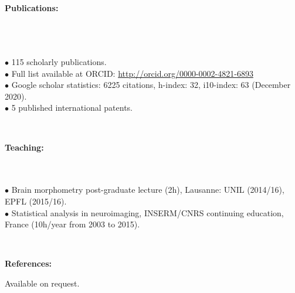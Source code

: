 \documentclass[english,10pt,a4paper]{scrartcl}
\begin{document}
\ \\
\noindent 
\begin{minipage}{.15\textwidth}
\textbf{Publications:}
\ \\ 
\ \\
\ \\
\ \\
\end{minipage}
\begin{minipage}{.85\textwidth}
{\tiny$\bullet$} 115 scholarly publications.\\
{\tiny$\bullet$} Full list available at ORCID: \url{http://orcid.org/0000-0002-4821-6893} \\
{\tiny$\bullet$} Google scholar statistics: 6225 citations, h-index: 32, i10-index: 63 (December 2020).\\
{\tiny$\bullet$} 5 published international patents. \\
\end{minipage}



\ \\
\noindent 
\begin{minipage}{.15\textwidth}
\textbf{Teaching:}
\ \\ 
\ \\
\  \\
\end{minipage}
\begin{minipage}{.85\textwidth}
{\tiny$\bullet$} Brain morphometry post-graduate lecture (2h), Lausanne: UNIL (2014/16), EPFL (2015/16).\\
{\tiny$\bullet$} Statistical analysis in neuroimaging, INSERM/CNRS continuing education, France (10h/year from 2003 to 2015).\\
\end{minipage}


\ \\
\noindent 
\begin{minipage}{.15\textwidth}
\textbf{References:}
\end{minipage}
\begin{minipage}{.85\textwidth}
Available on request.
\end{minipage}

%
\end{document}
